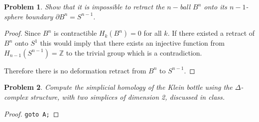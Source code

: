 \documentclass[10pt]{article}
\newcommand{\sk}{\vskip 10mm}
\newcommand{\bb}[1]{\mathbb{#1}}
\theoremstyle{plain}
\newtheorem{problem}{Problem}
\theoremstyle{remark}
\begin{document}
\sk

\begin{problem}
  Show that it is impossible to retract the $n-$ball $B^n$ onto its
  $n-1$-sphere boundary $\partial B^n=S^{n-1}$.
\end{problem}

\begin{proof}
  Since $B^n$ is contractible $H_k(B^n)=0$ for all $k$. If there existed
  a retract of $B^n$ onto $S^1$ this would imply that
  there exists an injective function from $H_{n-1}(S^{n-1})=\bb{Z}$
  to the trivial group which is a contradiction.

  Therefore there is no deformation retract from $B^n$ to $S^{n-1}$.
\end{proof}

\sk

\begin{problem}
  Compute the simplicial homology of the Klein bottle using the
  $\Delta$-complex structure, with two simplices of dimension 2, discussed in
  class.
\end{problem}

\begin{proof}
  \verb|goto A;|
\end{proof}

\end{document}

